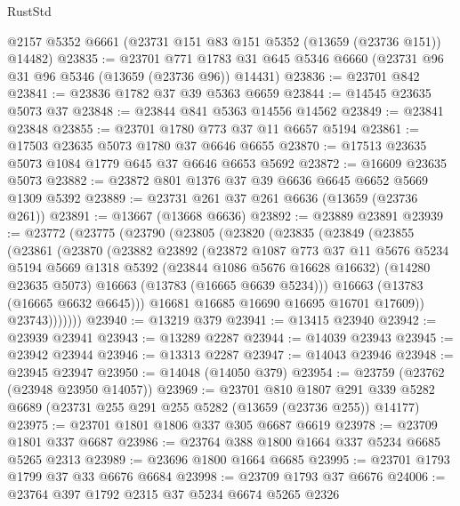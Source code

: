 \begin{lexlean}{RustStd}
\begin{coremodule}
    @2157
    @5352
    @6661
    (@23731 @151 @83 @151 @5352 (@13659 (@23736 @151)) @14482)
@23835 := @23701
    @771
    @1783
    @31
    @645
    @5346
    @6660
    (@23731 @96 @31 @96 @5346 (@13659 (@23736 @96)) @14431)
@23836 := @23701 @842
@23841 := @23836 @1782 @37 @39 @5363 @6659
@23844 := @14545 @23635 @5073 @37
@23848 := @23844 @841 @5363 @14556 @14562
@23849 := @23841 @23848
@23855 := @23701 @1780 @773 @37 @11 @6657 @5194
@23861 := @17503 @23635 @5073 @1780 @37 @6646 @6655
@23870 := @17513 @23635 @5073 @1084 @1779 @645 @37 @6646 @6653 @5692
@23872 := @16609 @23635 @5073
@23882 := @23872 @801 @1376 @37 @39 @6636 @6645 @6652 @5669 @1309 @5392
@23889 := @23731 @261 @37 @261 @6636 (@13659 (@23736 @261))
@23891 := @13667 (@13668 @6636)
@23892 := @23889 @23891
@23939 := @23772
    (@23775
      (@23790
        (@23805
          (@23820
            (@23835
              (@23849
                (@23855
                  (@23861
                    (@23870
                      (@23882
                        @23892
                        (@23872
                          @1087
                          @773
                          @37
                          @11
                          @5676
                          @5234
                          @5194
                          @5669
                          @1318
                          @5392
                          (@23844 @1086 @5676 @16628 @16632)
                          (@14280 @23635 @5073)
                          @16663
                          (@13783 (@16665 @6639 @5234)))
                        @16663
                        (@13783 (@16665 @6632 @6645)))
                      @16681
                      @16685
                      @16690
                      @16695
                      @16701
                      @17609))
                  @23743)))))))
@23940 := @13219 @379
@23941 := @13415 @23940
@23942 := @23939 @23941
@23943 := @13289 @2287
@23944 := @14039 @23943
@23945 := @23942 @23944
@23946 := @13313 @2287
@23947 := @14043 @23946
@23948 := @23945 @23947
@23950 := @14048 (@14050 @379)
@23954 := @23759 (@23762 (@23948 @23950 @14057))
@23969 := @23701
    @810
    @1807
    @291
    @339
    @5282
    @6689
    (@23731 @255 @291 @255 @5282 (@13659 (@23736 @255)) @14177)
@23975 := @23701 @1801 @1806 @337 @305 @6687 @6619
@23978 := @23709 @1801 @337 @6687
@23986 := @23764 @388 @1800 @1664 @337 @5234 @6685 @5265 @2313
@23989 := @23696 @1800 @1664 @6685
@23995 := @23701 @1793 @1799 @37 @33 @6676 @6684
@23998 := @23709 @1793 @37 @6676
@24006 := @23764 @397 @1792 @2315 @37 @5234 @6674 @5265 @2326

\end{coremodule}
\end{lexlean}
